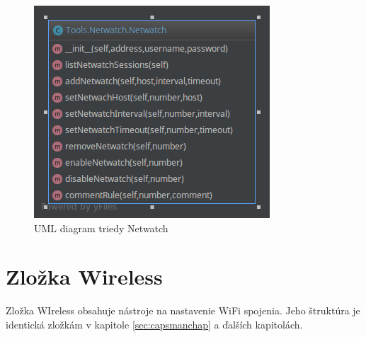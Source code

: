 \begin{figure}[H]
\centering
\includegraphics[scale=0.45]{../text/Netwatch.png}
\caption{UML diagram triedy Netwatch}
\label{fig:netwatchuml}
\end{figure}
\section{Zložka Wireless}
Zložka WIreless obsahuje nástroje na nastavenie WiFi spojenia. Jeho štruktúra je identická zložkám v kapitole \ref{sec:capsmanchap} a ďalších kapitolách.

